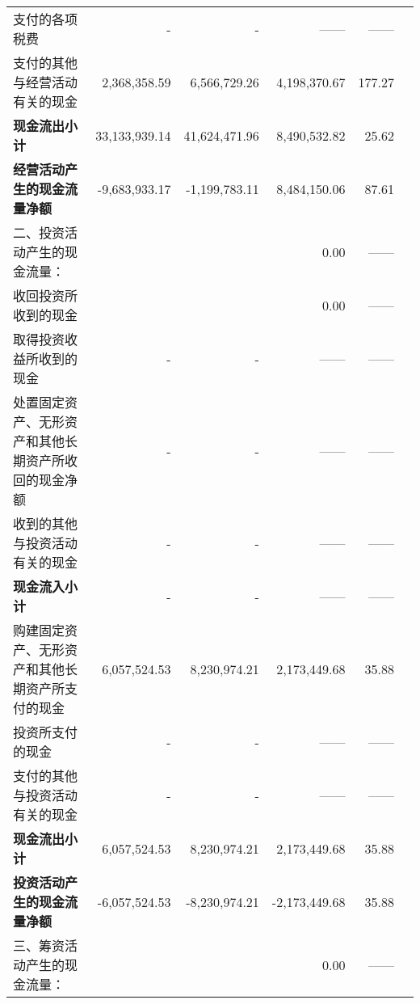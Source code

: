 \begin{longtable}{>{\scriptsize}l>{\scriptsize}r>{\scriptsize}r>{\scriptsize}r>{\scriptsize}r>{\scriptsize}r}
\hspace{2ex}	    支付的各项税费	&	  -           	&	  -           	&	——	&	——	\\
\hspace{2ex}	    支付的其他与经营活动有关的现金	&	2,368,358.59	&	6,566,729.26	&	4,198,370.67	&	177.27	\\
\hspace{3ex}\bfseries 	现金流出小计	&	33,133,939.14	&	41,624,471.96	&	8,490,532.82	&	25.62	\\
\hspace{3ex}\bfseries 经营活动产生的现金流量净额	&	-9,683,933.17	&	-1,199,783.11	&	8,484,150.06	&	87.61	\\
\midrule	二、投资活动产生的现金流量：	&		&		&	0.00	&	——	\\
\hspace{2ex}	    收回投资所收到的现金	&		&		&	0.00	&	——	\\
\hspace{2ex}	    取得投资收益所收到的现金	&	  -           	&	  -           	&	——	&	——	\\
\hspace{2ex}	 处置固定资产、无形资产和其他长期资产所收回的现金净额	&	  -           	&	  -           	&	——	&	——	\\
\hspace{2ex}	    收到的其他与投资活动有关的现金	&	  -           	&	  -           	&	——	&	——	\\
\hspace{3ex}\bfseries 	现金流入小计	&	  -           	&	  -           	&	——	&	——	\\
\hspace{2ex}	 购建固定资产、无形资产和其他长期资产所支付的现金	&	6,057,524.53	&	8,230,974.21	&	2,173,449.68	&	35.88	\\
\hspace{2ex}	    投资所支付的现金	&	  -           	&	  -           	&	——	&	——	\\
\hspace{2ex}	    支付的其他与投资活动有关的现金	&	  -           	&	  -           	&	——	&	——	\\
\hspace{3ex}\bfseries 	现金流出小计	&	6,057,524.53	&	8,230,974.21	&	2,173,449.68	&	35.88	\\
\hspace{3ex}\bfseries 	投资活动产生的现金流量净额	&	-6,057,524.53	&	-8,230,974.21	&	-2,173,449.68	&	35.88	\\
\midrule
	三、筹资活动产生的现金流量：	&		&		&	0.00	&	——	\\

\end{longtable}
